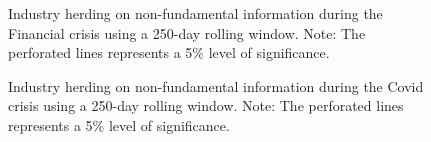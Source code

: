 \documentclass[
  letterpaper,
  DIV=11,
  numbers=noendperiod]{scrartcl}
\begin{document}
\begin{figure}[H]


\caption{\label{fig-rol_nonfundamental_fc}Industry herding on
non-fundamental information during the Financial crisis using a 250-day
rolling window. Note: The perforated lines represents a 5\% level of
significance.}

\end{figure}%

\begin{figure}[H]


\caption{\label{fig-rol_nonfundamental_cv}Industry herding on
non-fundamental information during the Covid crisis using a 250-day
rolling window. Note: The perforated lines represents a 5\% level of
significance.}

\end{figure}%
\end{document}
